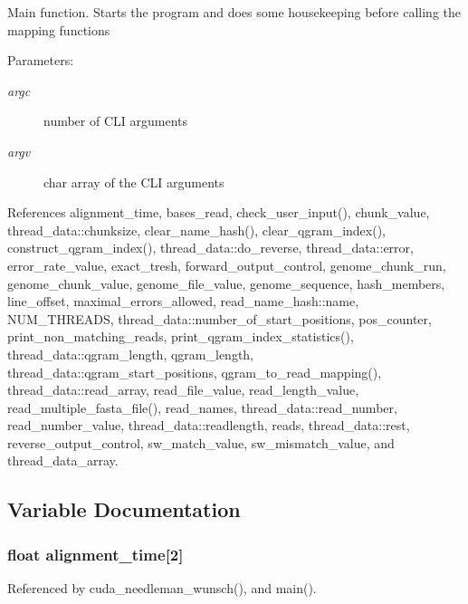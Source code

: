 Main function. Starts the program and does some housekeeping before calling the mapping functions \begin{Desc}
\item[Parameters:]
\begin{description}
\item[{\em argc}]number of CLI arguments \item[{\em argv}]char array of the CLI arguments \end{description}
\end{Desc}


References alignment\_\-time, bases\_\-read, check\_\-user\_\-input(), chunk\_\-value, thread\_\-data::chunksize, clear\_\-name\_\-hash(), clear\_\-qgram\_\-index(), construct\_\-qgram\_\-index(), thread\_\-data::do\_\-reverse, thread\_\-data::error, error\_\-rate\_\-value, exact\_\-tresh, forward\_\-output\_\-control, genome\_\-chunk\_\-run, genome\_\-chunk\_\-value, genome\_\-file\_\-value, genome\_\-sequence, hash\_\-members, line\_\-offset, maximal\_\-errors\_\-allowed, read\_\-name\_\-hash::name, NUM\_\-THREADS, thread\_\-data::number\_\-of\_\-start\_\-positions, pos\_\-counter, print\_\-non\_\-matching\_\-reads, print\_\-qgram\_\-index\_\-statistics(), thread\_\-data::qgram\_\-length, qgram\_\-length, thread\_\-data::qgram\_\-start\_\-positions, qgram\_\-to\_\-read\_\-mapping(), thread\_\-data::read\_\-array, read\_\-file\_\-value, read\_\-length\_\-value, read\_\-multiple\_\-fasta\_\-file(), read\_\-names, thread\_\-data::read\_\-number, read\_\-number\_\-value, thread\_\-data::readlength, reads, thread\_\-data::rest, reverse\_\-output\_\-control, sw\_\-match\_\-value, sw\_\-mismatch\_\-value, and thread\_\-data\_\-array.

\subsection{Variable Documentation}
\subsubsection[{alignment\_\-time}]{\setlength{\rightskip}{0pt plus 5cm}float {\bf alignment\_\-time}[2]}\label{saruman_8h_3d68a18b54886db326f17f526cc30d29}




Referenced by cuda\_\-needleman\_\-wunsch(), and main().

